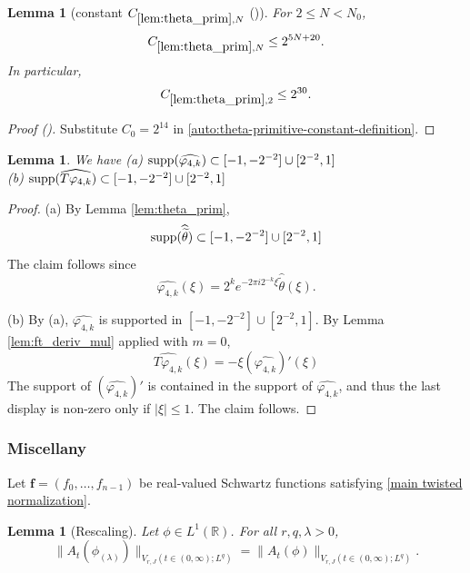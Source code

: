 \documentclass[12pt,reqno]{amsart}
\newcommand{\auto}{{({\tiny\faCar})}}
\theoremstyle{plain}
\newtheorem{lemma}[theorem]{Lemma}
\numberwithin{equation}{section}
\theoremstyle{remark}
\newcommand{\using}[1]{}
\begin{document}
\begin{lemma}[constant $C_{\ref{lem:theta_prim},N}$ \auto]\label{constant theta primitive}\using{lem:theta_prim}
For $2\le N<N_0$,
\begin{equation}\label{constant theta primitive bound}
C_{\ref{lem:theta_prim},N}\le2^{5N+20}.
\end{equation}
In particular,
\begin{equation}\label{auto:constant-theta-primitive-two}
C_{\ref{lem:theta_prim},2}\le2^{30}.
\end{equation}
\end{lemma}
\begin{proof}[Proof \auto]
Substitute $C_0=2^{14}$ in \eqref{auto:theta-primitive-constant-definition}.
\end{proof}

\begin{lemma}\label{lem:phi4_supp}\using{lem:theta_prim}\using{lem:ft_deriv_mul} We have
(a) $\textup{supp}(\widehat{\varphi_{4,k}})
\subset  [-1,-2^{-2}]\cup [2^{-2},1]$\\

(b) $\textup{supp}(\widehat{T\varphi_{4,k}})
\subset  [-1,-2^{-2}]\cup [2^{-2},1]$
\end{lemma}
\begin{proof}
(a) By Lemma \ref{lem:theta_prim},
\[\textup{supp}(\widehat{\widetilde{\theta}}) \subset [-1,-2^{-2}]\cup [2^{-2},1]\]
The claim follows since
\[\widehat{\varphi_{4,k}}(\xi)=2^ke^{-2\pi i2^{-k}\xi}\widehat{\widetilde\theta}(\xi).  \]

(b) By (a), $\widehat{\varphi_{4,k}}$ is supported in
$ [-1,-2^{-2}]\cup [2^{-2},1] $.
  By Lemma \ref{lem:ft_deriv_mul} applied with $m=0$,
  \[\widehat{T\varphi_{4,k}}(\xi) = -\xi(\widehat{\varphi_{4,k}})'(\xi) \]
The support of $(\widehat{\varphi_{4,k}})'$ is contained in the support of $\widehat{\varphi_{4,k}}$, and thus the last display is non-zero only if  $|\xi|\le 1$. The claim follows.
\end{proof}

\subsubsection{Miscellany}
Let $\mathbf{f}=(f_0,\dots,f_{n-1})$ be real-valued Schwartz functions satisfying \eqref{main twisted normalization}.


\begin{lemma}[Rescaling]\label{lem:rescaling}Let $\phi\in L^1(\mathbb{R})$.
For all $r,q,\lambda>0$,
\begin{equation}\label{auto:variation-rescaling-invariance} \|A_t({\phi_{(\lambda)}})\|_{V_{r,J}(t\in (0,\infty); L^q)} =  \|A_t({\phi})\|_{V_{r,J}(t\in (0,\infty); L^q)}. \end{equation}
\end{lemma}
\end{document}
